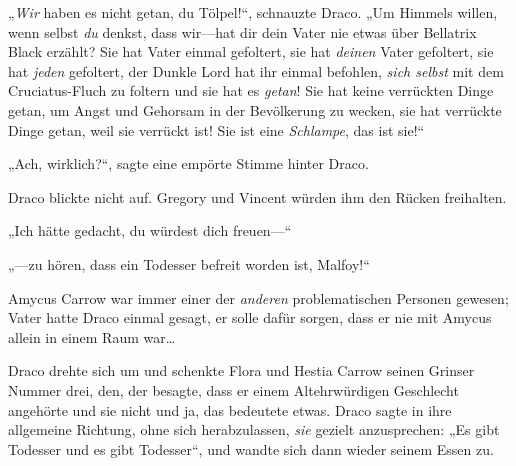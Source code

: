 „\emph{Wir} haben es nicht getan, du Tölpel!“, schnauzte Draco. „Um Himmels willen, wenn selbst \emph{du} denkst, dass wir—hat dir dein Vater nie etwas über Bellatrix Black erzählt? Sie hat Vater einmal gefoltert, sie hat \emph{deinen} Vater gefoltert, sie hat \emph{jeden} gefoltert, der Dunkle Lord hat ihr einmal befohlen, \emph{sich selbst} mit dem Cruciatus-Fluch zu foltern und sie hat es \emph{getan}! Sie hat keine verrückten Dinge getan, um Angst und Gehorsam in der Bevölkerung zu wecken, sie hat verrückte Dinge getan, weil sie verrückt ist! Sie ist eine \emph{Schlampe}, das ist sie!“

„Ach, wirklich?“, sagte eine empörte Stimme hinter Draco.

Draco blickte nicht auf. Gregory und Vincent würden ihm den Rücken freihalten.

„Ich hätte gedacht, du würdest dich freuen—“

„—zu hören, dass ein Todesser befreit worden ist, Malfoy!“

Amycus Carrow war immer einer der \emph{anderen} problematischen Personen gewesen; Vater hatte Draco einmal gesagt, er solle dafür sorgen, dass er nie mit Amycus allein in einem Raum war…

Draco drehte sich um und schenkte Flora und Hestia Carrow seinen Grinser Nummer drei, den, der besagte, dass er einem Altehrwürdigen Geschlecht angehörte und sie nicht und ja, das bedeutete etwas. Draco sagte in ihre allgemeine Richtung, ohne sich herabzulassen, \emph{sie} gezielt anzusprechen: „Es gibt Todesser und es gibt Todesser“, und wandte sich dann wieder seinem Essen zu.


